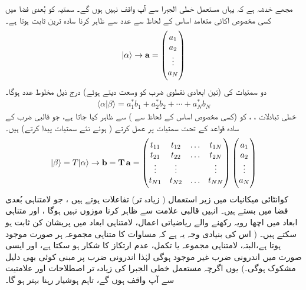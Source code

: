  مجھے خدشہ ہے کہ یہاں مستعمل خطی الجبرا سے آپ واقف نہیں ہوں گے۔ سمتیہ کو  بُعدی فضا میں کسی مخصوص اکائی متعامد اساس کے لحاظ سے  عدد     سے ظاہر کرنا سادہ ترین ثابت ہوتا ہے۔
	\begin{align}
		|\alpha \rangle \rightarrow \operatorname{\mathbf{a}} = \begin{pmatrix} 
			a_{1}\\
			a_{2}\\
			\vdots\\
			a_{N}
		 \end{pmatrix}
	\end{align}
 دو سمتیات کی 
  (تین ابعادی نقطوی ضرب کو وسعت دیتے ہوئے)  درج ذیل مخلوط عدد ہوگا۔
\begin{align}\label{مساوات_قواعد_اندرونی_ضرب}
	\langle \alpha | \beta\rangle =a_1^{\ast}b_1 + a_2^{\ast}b_2 + \dotsb +a_N^{\ast}b_N
\end{align}
خطی تبادلات ، ، کو (کسی مخصوص اساس کے لحاظ سے )  سے ظاہر کیا جاتا ہے، جو قالبی ضرب کے سادہ قواعد کے تحت سمتیات پر عمل کرتے ( ہوئے نئے سمتیات پیدا کرتے) ہیں۔
\begin{align}
	|\beta\rangle = T|\alpha \rangle \rightarrow \operatorname{\mathbf{b}} = \operatorname{\mathbf{T}}\operatorname{\mathbf{a}} = \begin{pmatrix}
		t_{11} & t_{12} & \hdots & t_{1N} \\ 
		t_{21} & t_{22} & \hdots & t_{2N} \\
		\vdots & \vdots & & \vdots \\
		t_{N1} & t_{N2} & \hdots & t_{NN} 
	\end{pmatrix}
\begin{pmatrix}
	a_{1}\\
	a_{2}\\
	\vdots\\
	a_{N}
\end{pmatrix}
\end{align}
کوانٹائی میکانیات میں  زیر استعمال     ( زیادہ تر)   تفاعلات ہوتے ہیں ، جو لامتناہی بُعدی فضا میں بستے ہیں۔ انہیں          قالبی علامت سے ظاہر کرنا   موزوں نہیں   ہوگا ، اور متناہی ابعاد میں  اچھا رویہ رکھنے والے  ریاضیاتی اعمال، لامتناہی ابعاد میں پریشان کن ثابت ہو سکتے ہیں۔ ( اس کی بنیادی وجہ یہ ہے کہ مساوات  کا متناہی مجموعہ ہر صورت موجود ہوتا ہے،البتہ، لامتناہی مجموعہ یا تکمل، عدم ارتکاز کا شکار ہو سکتا ہے، اور ایسی صورت میں اندرونی ضرب غیر موجود ہوگی لہٰذا اندرونی ضرب پر مبنی کوئی بھی دلیل مشکوک ہوگی۔)  یوں اگرچہ   مستعمل خطی الجبرا کی  زیادہ تر اصطلاحات اور علامتیت سے آپ واقف ہوں گے، تاہم ہوشیار رہنا بہتر ہو گا۔

